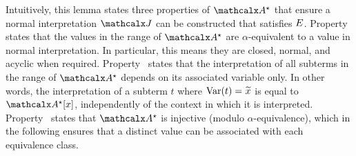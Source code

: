 \pagebreak[2]

Intuitively, this lemma states three properties of $\ValC$ that ensure a normal
interpretation $\J$ can be constructed that satisfies $E$. Property~ states that the
values in the range of $\ValC$ are $\alpha$-equivalent to a value in normal
interpretation. In particular, this means they are closed, normal, and acyclic when
required. Property~ states that the interpretation of all subterms in the
range of $\ValC$ depends on its associated variable only. In other words, the
interpretation of a subterm $t$ where $\muvar(t) = {\Varec{x}}$ is equal to
$\ValC \ec{x}$, independently of the context in which it is interpreted.
Property~ states that $\ValC$ is injective (modulo
$\alpha$-equivalence), which in the following ensures that a distinct value can
be associated with each equivalence class.

